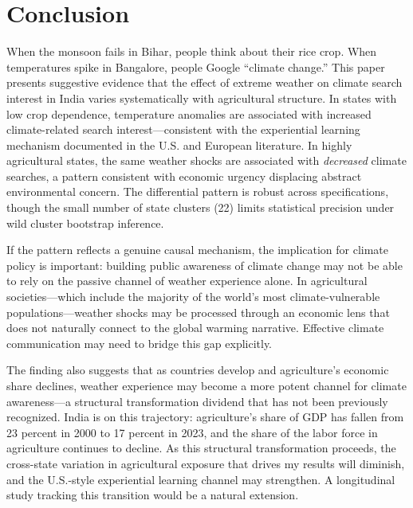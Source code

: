 \documentclass[12pt]{article}
\begin{document}
\section{Conclusion}

When the monsoon fails in Bihar, people think about their rice crop. When temperatures spike in Bangalore, people Google ``climate change.'' This paper presents suggestive evidence that the effect of extreme weather on climate search interest in India varies systematically with agricultural structure. In states with low crop dependence, temperature anomalies are associated with increased climate-related search interest---consistent with the experiential learning mechanism documented in the U.S. and European literature. In highly agricultural states, the same weather shocks are associated with \textit{decreased} climate searches, a pattern consistent with economic urgency displacing abstract environmental concern. The differential pattern is robust across specifications, though the small number of state clusters (22) limits statistical precision under wild cluster bootstrap inference.

If the pattern reflects a genuine causal mechanism, the implication for climate policy is important: building public awareness of climate change may not be able to rely on the passive channel of weather experience alone. In agricultural societies---which include the majority of the world's most climate-vulnerable populations---weather shocks may be processed through an economic lens that does not naturally connect to the global warming narrative. Effective climate communication may need to bridge this gap explicitly.

The finding also suggests that as countries develop and agriculture's economic share declines, weather experience may become a more potent channel for climate awareness---a structural transformation dividend that has not been previously recognized. India is on this trajectory: agriculture's share of GDP has fallen from 23 percent in 2000 to 17 percent in 2023, and the share of the labor force in agriculture continues to decline. As this structural transformation proceeds, the cross-state variation in agricultural exposure that drives my results will diminish, and the U.S.-style experiential learning channel may strengthen. A longitudinal study tracking this transition would be a natural extension.
\end{document}
